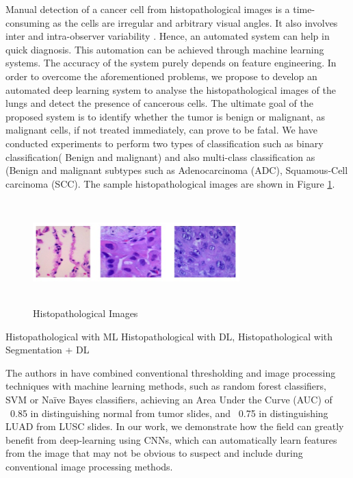 \documentclass{comjnl}
\begin{document}
Manual detection of a cancer cell from histopathological images is a time-consuming as the cells are irregular and arbitrary visual angles. It also involves inter and intra-observer variability \cite{sumaiya}. Hence, an automated system can help in quick diagnosis. This automation can be achieved through machine learning systems. The accuracy of the system purely depends on feature engineering. In order to overcome the aforementioned problems, we propose to develop an automated deep learning system to analyse the histopathological images of the lungs and detect the presence of cancerous cells. The ultimate goal of the proposed system is to identify whether the tumor is benign or malignant, as malignant cells, if not treated immediately, can prove to be fatal. We have conducted experiments to perform two types of classification such as binary classification( Benign  and malignant) and also multi-class classification as (Benign  and malignant subtypes such as Adenocarcinoma (ADC), Squamous-Cell carcinoma (SCC). The sample histopathological images are shown in Figure \ref{histo_img}.


\begin{figure}[htbp]
\centerline{\includegraphics[width=8cm, height=4cm]{./figures/histo_img.png}}
\caption{Histopathological Images}
\label{histo_img}
\end{figure}

Histopathological with ML
Histopathological with DL,
Histopathological with Segmentation + DL

The authors in \cite{yu} have combined conventional thresholding and image processing techniques with machine learning methods, such as random forest classifiers, SVM or Naïve Bayes classifiers, achieving an Area Under the Curve (AUC) of ~0.85 in distinguishing normal from tumor slides, and ~0.75 in distinguishing LUAD from LUSC slides. In our work, we demonstrate how the field can greatly benefit from deep-learning using CNNs, which can automatically learn features from the image that may not be obvious to suspect and include during conventional image processing methods.
\end{document}
